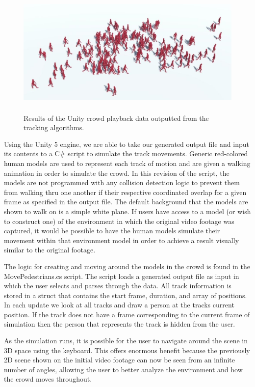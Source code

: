 \documentclass[12pt, onecolumn, conference]{IEEEtran}
\begin{document}
\begin{figure}[!t]
\centering
\includegraphics[height=2.5in]{Screenshots/Capture4.JPG}
\caption{Results of the Unity crowd playback data outputted from the tracking algorithms.}
\label{Unity}
\end{figure}

Using the Unity 5 engine, we are able to take our generated output file and input its contents to a C\# script to simulate the track movements. Generic red-colored human models are used to represent each track of motion and are given a walking animation in order to simulate the crowd. In this revision of the script, the models are not programmed with any collision detection  logic to prevent them from walking thru one another if their respective coordinated overlap for a given frame as specified in the output file. The default background that the models are shown to walk on is a simple white plane. If users have access to a model (or wish to construct one) of the environment in which the original video footage was captured, it would be possible to have the human models simulate their movement within that environment model in order to achieve a result visually similar to the original footage.

The logic for creating and moving around the models in the crowd is found in the MovePedestrians.cs script. The script loads a generated output file as input in which the user selects and parses through the data. All track information is stored in a struct that contains the start frame, duration, and array of positions. In each update we look at all tracks and draw a person at the tracks current position. If the track does not have a frame corresponding to the current frame of simulation then the person that represents the track is hidden from the user. 

As the simulation runs, it is possible for the user to navigate around the scene in 3D space using the keyboard. This offers enormous benefit because the previously 2D scene shown on the initial video footage can now be seen from an infinite number of angles, allowing the user to better analyze the environment and how the crowd moves throughout. 
\end{document}
